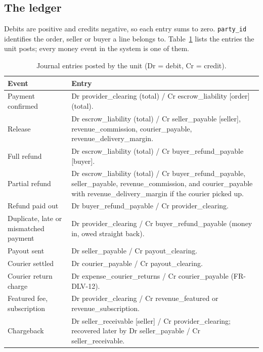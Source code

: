 \documentclass[11pt,a4paper]{article}
\begin{document}
\subsection{The ledger}
\label{sec:ledger}
Debits are positive and credits negative, so each entry sums to zero. \texttt{party\_id} identifies the order, seller or buyer a line belongs to. Table~\ref{tab:postings} lists the entries the unit posts; every money event in the system is one of them.

\begin{table}[!htbp]
\centering
\small
\caption{Journal entries posted by the unit (Dr = debit, Cr = credit).}
\label{tab:postings}
\begin{tabularx}{\textwidth}{@{}>{\raggedright\arraybackslash}p{3.2cm} X@{}}
\toprule
\textbf{Event} & \textbf{Entry} \\ \midrule
Payment confirmed & Dr provider\_clearing (total) / Cr escrow\_liability [order] (total). \\
Release & Dr escrow\_liability (total) / Cr seller\_payable [seller], revenue\_commission, courier\_payable, revenue\_delivery\_margin. \\
Full refund & Dr escrow\_liability (total) / Cr buyer\_refund\_payable [buyer]. \\
Partial refund & Dr escrow\_liability (total) / Cr buyer\_refund\_payable, seller\_payable, revenue\_commission, and courier\_payable with revenue\_delivery\_margin if the courier picked up. \\
Refund paid out & Dr buyer\_refund\_payable / Cr provider\_clearing. \\
Duplicate, late or mismatched payment & Dr provider\_clearing / Cr buyer\_refund\_payable (money in, owed straight back). \\
Payout sent & Dr seller\_payable / Cr payout\_clearing. \\
Courier settled & Dr courier\_payable / Cr payout\_clearing. \\
Courier return charge & Dr expense\_courier\_returns / Cr courier\_payable (FR-DLV-12). \\
Featured fee, subscription & Dr provider\_clearing / Cr revenue\_featured or revenue\_subscription. \\
Chargeback & Dr seller\_receivable [seller] / Cr provider\_clearing; recovered later by Dr seller\_payable / Cr seller\_receivable. \\
\bottomrule
\end{tabularx}
\end{table}
\end{document}
